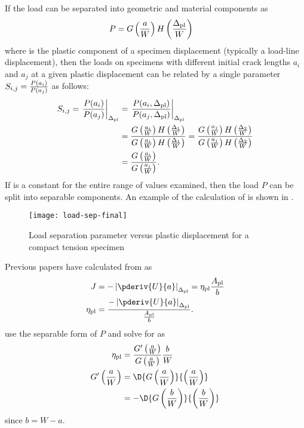 If the load can be separated into geometric and material components as
\begin{align}
P &= G \left( \frac{a}{W} \right) H \left( \frac{\Delta_\textnormal{pl}}{W} \right)
\end{align}	
where \Deltapl {} is the plastic component of a specimen displacement (typically a load-line displacement), then the loads on specimens with different initial crack lengths \(a_i\) and \(a_j\) at a given plastic displacement can be related by a single parameter \(S_{i,j} = \frac{P(a_i)}{P(a_j)}\) as follows:
\begin{align}
S_{i,j} = \left. \frac{P(a_i)}{P(a_j)} \right|_{\Delta_\textnormal{pl}} &= \left. \frac{P(a_i,\Delta_\textnormal{pl})}{P(a_j,\Delta_\textnormal{pl})} \right|_{\Delta_\textnormal{pl}} \\
     &= \frac{G \left( \frac{a_i}{W} \right) H \left( \frac{\Delta_1}{W} \right)}{G \left( \frac{a_i}{W} \right) H \left( \frac{\Delta_1}{W} \right)}
     = \frac{G \left( \frac{a_j}{W} \right) H \left( \frac{\Delta_2}{W} \right)}{G \left( \frac{a_j}{W} \right) H \left( \frac{\Delta_2}{W} \right)} \\
     &= \frac{G \left( \frac{a_i}{W} \right)}{G \left( \frac{a_j}{W} \right)} .
\end{align}
If \Sij{} is a constant for the entire range of \Deltapl values examined, then the load \(P\) can be split into separable components. An example of the calculation of \Sij is shown in .
\begin{figure}
\centering
\texttt{[image: load-sep-final]}
\caption[Load separation parameter versus plastic displacement for a compact tension specimen]{\label{fig:load-separation} Load separation parameter versus plastic displacement for a compact tension specimen \citep{sharobeamlandes1991}}
\end{figure}
Previous papers have calculated \etapl from \J as
\begin{align}
\J &= - \left| \pderiv{U}{a} \right|_{\Deltapl} = \etapl \frac{A_\textnormal{pl}}{b} \\
\etapl &= \frac{- \left| \pderiv{U}{a} \right|_{\Deltapl}}{\frac{A_\textnormal{pl}}{b}} .
\end{align}
\citet{sharobeamlandes1991} use the separable form of \(P\) and solve for \etapl as
\begin{align}
\etapl &= \frac{G' \left( \frac{a}{W} \right)}{G \left( \frac{a}{W} \right)} \frac{b}{W} \\
G' \left( \frac{a}{W} \right) &= \D{{G\left(\frac{a}{W}\right)}}{\left(\frac{a}{W}\right)} \\
                              &= - \D{{G\left(\frac{b}{W}\right)}}{\left(\frac{b}{W}\right)}
\end{align}
since \(b=W-a\).

